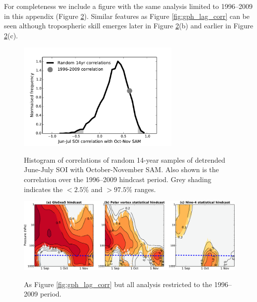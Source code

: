 \begin{subappendices}
For completeness we include a figure with the same analysis limited to
1996--2009 in this appendix (Figure \ref{fig:lag_height_short}). Similar
features as Figure \ref{fig:gph_lag_corr} can be seen although tropospheric
skill emerges later in Figure \ref{fig:lag_height_short}(b) and earlier in
Figure \ref{fig:lag_height_short}(c).


\begin{figure}[t]
  \centering
  \noindent\includegraphics[width=0.7\textwidth,angle=0]{figures/chapter-seasonal/SAM_SOI_corr.pdf}\\
  \caption[Correlation of the SOI with the SAM.]{Histogram of correlations of
    random 14-year samples of detrended June-July SOI with October-November
    SAM. Also shown is the correlation over the 1996--2009 hindcast period. Grey
  shading indicates the $<2.5$\% and $>97.5$\% ranges.}\label{fig:sam_soi_corr}
\end{figure}

\begin{figure}[t]
  \noindent\includegraphics[width=\textwidth,angle=0]{figures/chapter-seasonal/lag_height_short.pdf}\\
  \caption[Lag-height correlation of GloSea5 polar cap geopotential height]{As
    Figure \ref{fig:gph_lag_corr} but all analysis restricted to the 1996--2009
    period.}\label{fig:lag_height_short}
\end{figure}

\end{subappendices}


